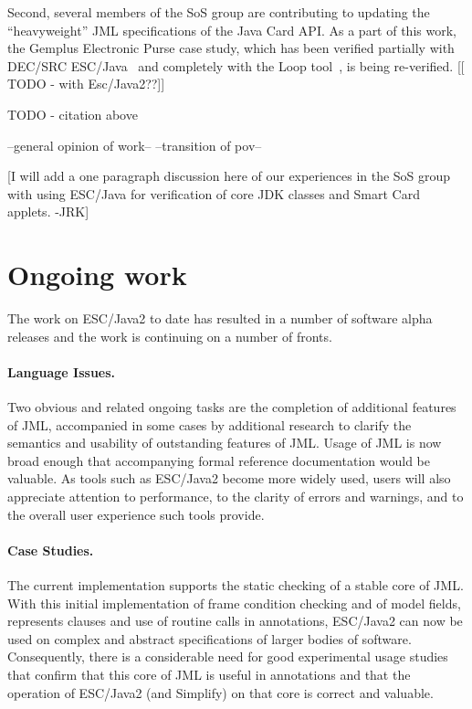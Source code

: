 \documentclass{sig-alternate}
\begin{document}
Second, several members of the SoS group are contributing to updating
the ``heavyweight'' JML specifications of the Java Card API.  As a
part of this work, the Gemplus Electronic Purse case study, which has
been verified partially with DEC/SRC ESC/Java~\cite{CatanoHuisman02}
and completely with the Loop tool~\cite{JoachimsThesis?}, is being
re-verified. [[ TODO - with Esc/Java2??]]

TODO - citation above

--general opinion of work--
--transition of pov--

[I will add a one paragraph discussion here of our experiences in
the SoS group with using ESC/Java for verification of core JDK classes
and Smart Card applets. -JRK]

\section{Ongoing work}
The work on ESC/Java2 to date has resulted in a number of software
alpha releases and the work is continuing on a number of fronts.

\paragraph*{Language Issues.} Two obvious and related ongoing tasks are
the completion of additional features of JML, accompanied in some
cases by additional research to clarify the semantics and usability of
outstanding features of JML.  Usage of JML is now broad enough that
accompanying formal reference documentation would be valuable.  As
tools such as ESC/Java2 become more widely used, users will also
appreciate attention to performance, to the clarity of errors and
warnings, and to the overall user experience such tools provide.

\paragraph*{Case Studies.} The current implementation supports the
static checking of a stable core of JML.  With this initial
implementation of frame condition checking and of model fields,
represents clauses and use of routine calls in annotations, ESC/Java2
can now be used on complex and abstract specifications of larger
bodies of software.  Consequently, there is a considerable need for
good experimental usage studies that confirm that this core of JML is
useful in annotations and that the operation of ESC/Java2 (and
Simplify) on that core is correct and valuable.
\end{document}
